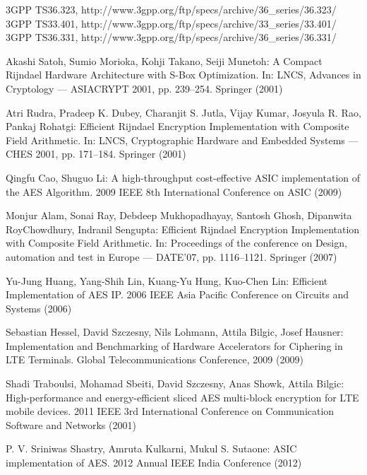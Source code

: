 \documentclass[12pt]{llncs}
\begin{document}
\begin{thebibliography}{4}

 3GPP TS36.323, http://www.3gpp.org/ftp/specs/archive/36\_series/36.323/
 3GPP TS33.401, http://www.3gpp.org/ftp/specs/archive/33\_series/33.401/
 3GPP TS36.331, http://www.3gpp.org/ftp/specs/archive/36\_series/36.331/

 Akashi Satoh, Sumio Morioka, Kohji Takano, Seiji Munetoh: A Compact Rijndael Hardware Architecture with S-Box Optimization. In: LNCS, Advances in Cryptology — ASIACRYPT 2001, pp. 239--254. Springer (2001)


 Atri Rudra, Pradeep K. Dubey, Charanjit S. Jutla, Vijay Kumar, Josyula R. Rao, Pankaj Rohatgi: Efficient Rijndael Encryption Implementation with Composite Field Arithmetic. In: LNCS, Cryptographic Hardware and Embedded Systems — CHES 2001, pp. 171--184. Springer (2001)


 Qingfu Cao, Shuguo Li: A high-throughput cost-effective ASIC implementation of the AES Algorithm. 2009 IEEE 8th International Conference on ASIC (2009)


 Monjur Alam, Sonai Ray,	Debdeep Mukhopadhayay, Santosh Ghosh,  Dipanwita RoyChowdhury, Indranil Sengupta: Efficient Rijndael Encryption Implementation with Composite Field Arithmetic. In: Proceedings of the conference on Design, automation and test in Europe
 — DATE'07, pp. 1116--1121. Springer (2007)


 Yu-Jung Huang, Yang-Shih Lin,  Kuang-Yu Hung, Kuo-Chen Lin: Efficient Implementation of AES IP. 2006 IEEE Asia Pacific Conference on Circuits and Systems (2006)

 Sebastian Hessel, David Szczesny, Nils Lohmann, Attila Bilgic, Josef Hausner: Implementation and Benchmarking of Hardware Accelerators for Ciphering in LTE Terminals. Global Telecommunications Conference, 2009 (2009)

 Shadi Traboulsi, Mohamad Sbeiti, David Szczesny, Anas Showk, Attila Bilgic: High-performance and energy-efficient sliced AES multi-block encryption for LTE mobile devices. 2011 IEEE 3rd International Conference on Communication Software and Networks (2001)


 P. V. Sriniwas Shastry, Amruta Kulkarni, Mukul S. Sutaone: ASIC implementation of AES. 2012 Annual IEEE India Conference  (2012)


\end{thebibliography}
\end{document}
